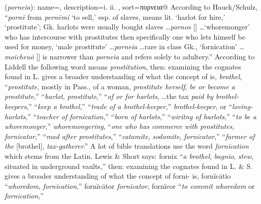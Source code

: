 \item[Prostitution,]

(\textit{porneia}):
{
    name=,
    description={i.  ii. },
    sort=πορνεια@
}
According to Hauck/Schulz, ``\emph{pornē} from \emph{pernēmi} `to sell,' esp. of slaves, means lit. `harlot for hire,' `prostitute'; Gk. harlots were usually bought slaves \ldots \emph{pornos} [] \ldots `whoremonger' who has intercourse with prostitutes then specifically one who lets himself be used for money, `male prostitute' \ldots \emph{porneia} \ldots rare in class Gk., `fornication' \ldots \emph{moicheuō} [] is narrower than \emph{porneia} and refers solely to adultery.''
According to Liddell the following word  means \emph{prostitution}, 
then: examining the cognates found in L. gives a broader understanding of what the concept of  is,
 \emph{brothel}, 
 ``\emph{prostitute}, mostly in Pass., of a woman, \emph{prostitute herself}, \emph{be or become a prostitute},'' 
 ``\emph{harlot}, \emph{prostitute},'' 
 ``\emph{of or for harlots}, \ldots the tax \emph{paid by brothel-keepers},'' 
 ``\emph{keep a brothel},'' 
 ``\emph{trade of a brothel-keeper},'' 
 \emph{brothel-keeper}, 
 or  ``\emph{loving-harlots},'' 
 ``\emph{teacher of fornication},'' 
 ``\emph{born of harlots},'' 
 ``\emph{wiritng of harlots},'' 
 ``\emph{to be a whoremonger},'' 
 \emph{whoremongering}, 
 ``\emph{one who has commerce with prostitutes}, \emph{fornicator},'' 
 ``\emph{mad after prostitutes},'' 
 ``\emph{catamite}, \emph{sodomite}, \emph{fornicator},'' 
 ``\emph{farmer of the} [brothel], \emph{tax-gatherer}.'' 
A lot of bible translations use the word \emph{fornication} which stems from the Latin. Lewis \& Short says: fornix ``\emph{a brothel},  \emph{bagnio}, \emph{stew}, situated in underground vaults,''
then: examining the cognates found in L. \& S. gives a broader understanding of what the concept of forni- is,
fornĭcātĭo ``\emph{whoredom}, \emph{fornication},'' 
fornĭcātor \emph{fornicator}, 
fornĭcor ``\emph{to commit whoredom} or \emph{fornication},'' 
